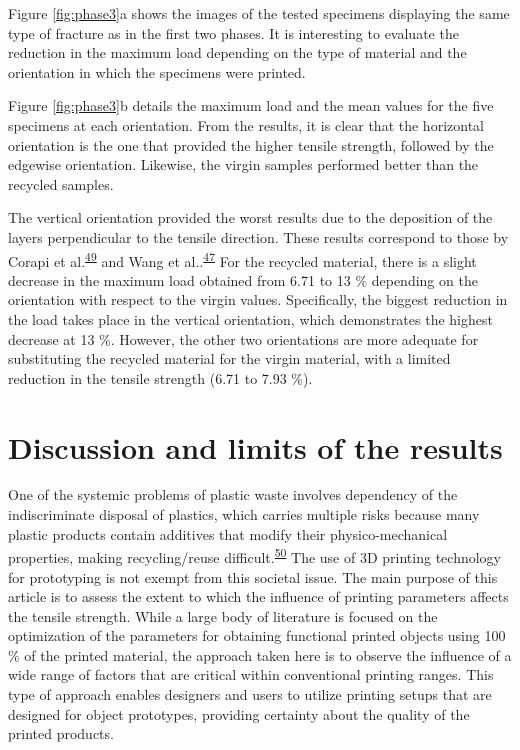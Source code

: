 \documentclass[
  12pt]{article}
\begin{document}
Figure \ref{fig:phase3}a shows the images of the tested specimens displaying the same type of fracture as in the first two phases.
It is interesting to evaluate the reduction in the maximum load depending on the type of material and the orientation in which the specimens were printed.

Figure \ref{fig:phase3}b details the maximum load and the mean values for the five specimens at each orientation.
From the results, it is clear that the horizontal orientation is the one that provided the higher tensile strength, followed by the edgewise orientation.
Likewise, the virgin samples performed better than the recycled samples.

The vertical orientation provided the worst results due to the deposition of the layers perpendicular to the tensile direction.
These results correspond to those by Corapi et al.\textsuperscript{\protect\hyperlink{ref-Corapi2019}{49}} and Wang et al..\textsuperscript{\protect\hyperlink{ref-Wang2020h}{47}}
For the recycled material, there is a slight decrease in the maximum load obtained from 6.71 to 13 \% depending on the orientation with respect to the virgin values. Specifically, the biggest reduction in the load takes place in the vertical orientation, which demonstrates the highest decrease at 13 \%.
However, the other two orientations are more adequate for substituting the recycled material for the virgin material, with a limited reduction in the tensile strength (6.71 to 7.93 \%).

\hypertarget{section:discussion}{%
\section{Discussion and limits of the results}\label{section:discussion}}

One of the systemic problems of plastic waste involves dependency of the indiscriminate disposal of plastics, which carries multiple risks because many plastic products contain additives that modify their physico-mechanical properties, making recycling/reuse difficult.\textsuperscript{\protect\hyperlink{ref-Wagner2020}{50}}
The use of 3D printing technology for prototyping is not exempt from this societal issue. The main purpose of this article is to assess the extent to which the influence of printing parameters affects the tensile strength.
While a large body of literature is focused on the optimization of the parameters for obtaining functional printed objects using 100 \% of the printed material, the approach taken here is to observe the influence of a wide range of factors that are critical within conventional printing ranges.
This type of approach enables designers and users to utilize printing setups that are designed for object prototypes, providing certainty about the quality of the printed products.
\end{document}
